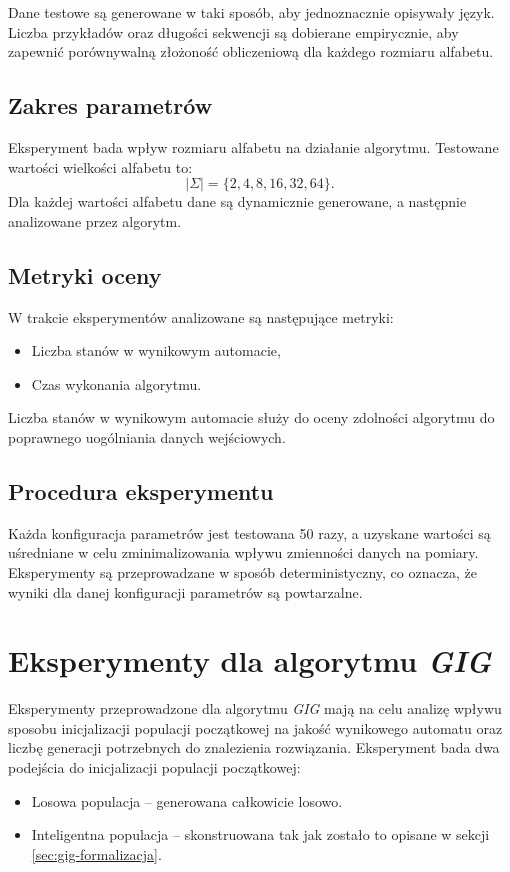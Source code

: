 Dane testowe są generowane w taki sposób, aby jednoznacznie opisywały język. Liczba przykładów oraz długości sekwencji są dobierane empirycznie, aby zapewnić porównywalną złożoność obliczeniową dla każdego rozmiaru alfabetu.  

\subsection{Zakres parametrów}  
Eksperyment bada wpływ rozmiaru alfabetu na działanie algorytmu. Testowane wartości wielkości alfabetu to:  
\[
|\Sigma| = \{2, 4, 8, 16, 32, 64\}.
\]  
Dla każdej wartości alfabetu dane są dynamicznie generowane, a następnie analizowane przez algorytm.  
\subsection{Metryki oceny}  
W trakcie eksperymentów analizowane są następujące metryki:  
\begin{itemize}  
    \item Liczba stanów w wynikowym automacie,  
    \item Czas wykonania algorytmu.  
\end{itemize}  

Liczba stanów w wynikowym automacie służy do oceny zdolności algorytmu do poprawnego uogólniania danych wejściowych.  

\subsection{Procedura eksperymentu}  
Każda konfiguracja parametrów jest testowana 50 razy, a uzyskane wartości są uśredniane w celu zminimalizowania wpływu zmienności danych na pomiary. Eksperymenty są przeprowadzane w sposób deterministyczny, co oznacza, że wyniki dla danej konfiguracji parametrów są powtarzalne.  


\section{Eksperymenty dla algorytmu \textit{GIG}} 
Eksperymenty przeprowadzone dla algorytmu \textit{GIG} mają na celu analizę wpływu sposobu inicjalizacji populacji początkowej na jakość wynikowego automatu oraz liczbę generacji potrzebnych do znalezienia rozwiązania. Eksperyment bada dwa podejścia do inicjalizacji populacji początkowej:  
\begin{itemize}  
    \item Losowa populacja – generowana całkowicie losowo.  
    \item Inteligentna populacja – skonstruowana tak jak zostało to opisane w sekcji \ref{sec:gig-formalizacja}.  
\end{itemize}  

